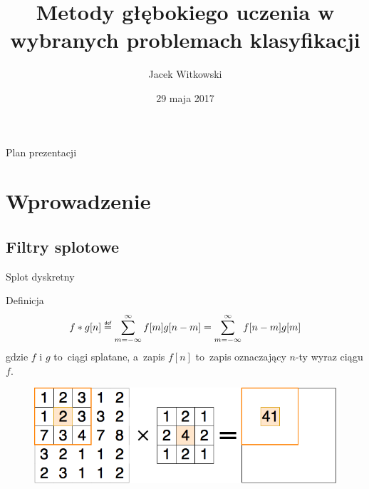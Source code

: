 \documentclass[xcolor=dvipsnames]{beamer}
\title[Obrona pracy dyplomowej]{Metody głębokiego uczenia w wybranych problemach klasyfikacji}
\subtitle[]{}
\author[J. Witkowski]{Jacek Witkowski}
\institute[Instytut Informatyki]{
  PW EiTI \\
  Instytut Informatyki \\
  promotor: mgr inż.~Rajmund Kożuszek
}
\date[Maj 2017]{29 maja 2017}
\newcommand\defeq{\mathrel{\overset{\makebox[0pt]{\mbox{\normalfont\tiny\sffamily def}}}{=}}}
\begin{document}
\begin{frame}[plain]
  \titlepage
\end{frame}

\begin{frame}{Plan prezentacji}
  \tableofcontents
\end{frame}


\section{Wprowadzenie}
\subsection{Filtry splotowe}
\begin{frame}{Splot dyskretny}
    \begin{block}{Definicja}
        \begin{equation*}
            f\ast g[n]\defeq \sum\limits_{m=-\infty}^{\infty}f[m]g[n-m] = \sum\limits_{m=-\infty}^{\infty}f[n-m]g[m]
        \end{equation*}
        gdzie $f$ i $g$ to~ciągi splatane, a~zapis $f[n]$ to~zapis oznaczający $n$-ty wyraz ciągu $f$.
    \end{block}
    \begin{figure}
		\includegraphics[width=\linewidth, keepaspectratio] {img/convolutional_filter.png}
	\end{figure}
\end{frame}
\end{document}
